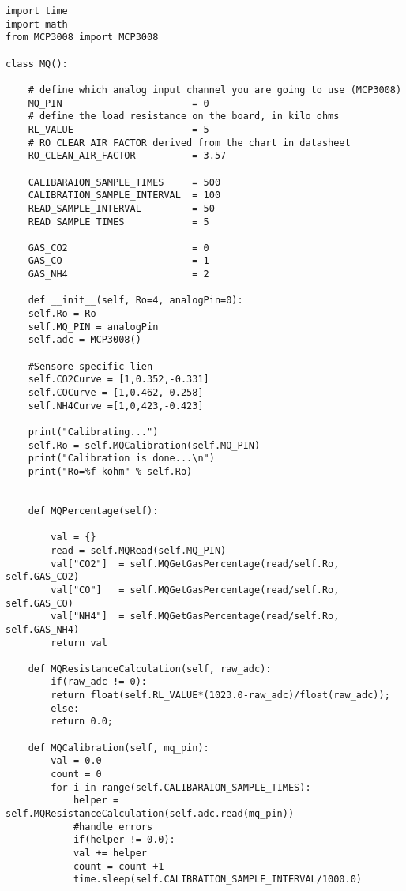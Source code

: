 
\addchap{\langanhang}
\renewcommand{\thefigure}{A\arabic{figure}}

\setcounter{figure}{0}



\begin{lstlisting}[label=list:MQClass, caption={Auswertung der MQ-Sensorwerte}]
import time
import math
from MCP3008 import MCP3008

class MQ():

	# define which analog input channel you are going to use (MCP3008)
	MQ_PIN                       = 0        
	# define the load resistance on the board, in kilo ohms
	RL_VALUE                     = 5        
	# RO_CLEAR_AIR_FACTOR derived from the chart in datasheet
	RO_CLEAN_AIR_FACTOR          = 3.57    
	
	CALIBARAION_SAMPLE_TIMES     = 500       
	CALIBRATION_SAMPLE_INTERVAL  = 100      
	READ_SAMPLE_INTERVAL         = 50       
	READ_SAMPLE_TIMES            = 5        
	
	GAS_CO2                      = 0
	GAS_CO                       = 1
	GAS_NH4                      = 2
	
	def __init__(self, Ro=4, analogPin=0):
	self.Ro = Ro
	self.MQ_PIN = analogPin
	self.adc = MCP3008()
	
	#Sensore specific lien
	self.CO2Curve = [1,0.352,-0.331]   
	self.COCurve = [1,0.462,-0.258]  
	self.NH4Curve =[1,0,423,-0.423]   
	
	print("Calibrating...")
	self.Ro = self.MQCalibration(self.MQ_PIN)
	print("Calibration is done...\n")
	print("Ro=%f kohm" % self.Ro)
	
	
	def MQPercentage(self):
	
		val = {}
		read = self.MQRead(self.MQ_PIN)
		val["CO2"]  = self.MQGetGasPercentage(read/self.Ro, self.GAS_CO2)
		val["CO"]   = self.MQGetGasPercentage(read/self.Ro, self.GAS_CO)
		val["NH4"]  = self.MQGetGasPercentage(read/self.Ro, self.GAS_NH4)
		return val
	
	def MQResistanceCalculation(self, raw_adc):
		if(raw_adc != 0):
		return float(self.RL_VALUE*(1023.0-raw_adc)/float(raw_adc));            
		else:
		return 0.0;
	
	def MQCalibration(self, mq_pin):
		val = 0.0
		count = 0
		for i in range(self.CALIBARAION_SAMPLE_TIMES):          
			helper = self.MQResistanceCalculation(self.adc.read(mq_pin))
			#handle errors		
			if(helper != 0.0):
			val += helper
			count = count +1
			time.sleep(self.CALIBRATION_SAMPLE_INTERVAL/1000.0)
	

\end{lstlisting}
